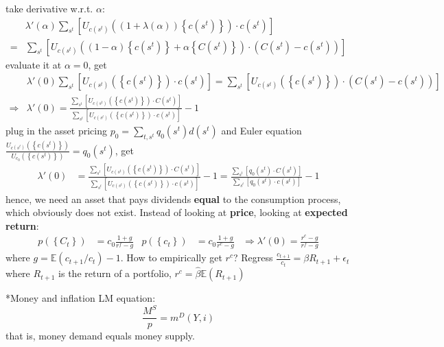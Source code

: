 \documentclass[10pt,landscape,a4paper]{article}
\makeatletter
\renewcommand{\section}{\@startsection{section}{1}{0mm}{1ex}{.2ex}{\normalsize\bfseries}}
\makeatother
\begin{document}
\begin{multicols*}{3}
take derivative w.r.t. $\alpha$:
\begin{align*}
    &\lambda'(\alpha)\sum_{s^t}\left[U_{c(s^t)}\left((1+\lambda(\alpha))\left\{c(s^t)\right\}\right)\cdot c(s^t) \right]\\
    =& \sum_{s^t} \left[ U_{c(s^t)}\left( (1-\alpha)\left\{c(s^t)\right\}+\alpha\left\{C(s^t)\right\} \right) \cdot\left(C(s^t)-c(s^t)\right) \right]
\end{align*}
evaluate it at $\alpha =0$, get
\begin{align*}
   & \lambda'(0)\sum_{s^t}\left[U_{c(s^t)}\left(\left\{c(s^t)\right\}\right)\cdot c(s^t) \right] = \sum_{s^t} \left[ U_{c(s^t)}\left( \left\{c(s^t)\right\} \right) \cdot\left(C(s^t)-c(s^t)\right) \right] \\
\Rightarrow & \lambda'(0) = \frac{\sum_{s^t}\left[ U_{c(s^t)}\left( \left\{c(s^t)\right\} \right) \cdot C(s^t) \right]}{\sum_{s^t}\left[U_{c(s^t)}\left(\left\{c(s^t)\right\}\right)\cdot c(s^t) \right]}-1
\end{align*}
plug in the asset pricing $p_0=\sum_{t,s^t}q_0(s^t)d(s^t)$ and Euler equation $\frac{U_{c(s^t)}\left(\left\{c(s^t)\right\} \right)}{U_{c_0}\left( \left\{c(s^t)\right\} \right)} = q_0\left(s^t\right)$, get
\begin{align*}
    \lambda'(0) &= \frac{\sum_{s^t}\left[ U_{c(s^t)}\left( \left\{c(s^t)\right\} \right) \cdot C(s^t) \right]}{\sum_{s^t}\left[U_{c(s^t)}\left(\left\{c(s^t)\right\}\right)\cdot c(s^t) \right]}-1 = \frac{\sum_{s^t}\left[ q_0(s^t) \cdot C(s^t) \right]}{\sum_{s^t}\left[q_0(s^t) \cdot c(s^t) \right]}-1
\end{align*}
hence, we need an asset that pays dividends \textbf{equal} to the consumption process, which obviously does not exist. Instead of looking at \textbf{price}, looking at \textbf{expected return}:
\begin{align*}
    p\left( \left\{C_t\right\} \right)&= c_0\frac{1+g}{r^f-g} & p\left( \left\{c_t\right\} \right) &= c_0\frac{1+g}{r^c -g} &\Rightarrow \lambda'(0) = \frac{r^c-g}{r^f-g}
\end{align*}
where $g=\mathbb{E}(c_{t+1}/c_t)-1$. How to empirically get $r^c$? Regress $\frac{c_{t+1}}{c_t}=\beta R_{t+1}+\epsilon_t$ where $R_{t+1}$ is the return of a portfolio, $r^c = \hat{\beta}\mathbb{E}(R_{t+1})$

\section*{Money and inflation}
LM equation: 
$$\frac{M^S}{p} = m^D(Y,i)$$
that is, money demand equals money supply.


\end{multicols*}
\end{document}
